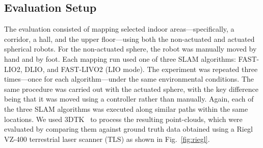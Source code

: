 \documentclass[a4paper, conference]{IEEEtran}
\begin{document}
\subsection{Evaluation Setup}
The evaluation consisted of mapping selected indoor areas—specifically, a corridor, a hall, and the upper floor—using both the non-actuated and actuated spherical robots. 
For the non-actuated sphere, the robot was manually moved by hand and by foot. 
Each mapping run used one of three SLAM algorithms: FAST-LIO2, DLIO, and FAST-LIVO2 (LIO mode). 
The experiment was repeated three times—once for each algorithm—under the same environmental conditions. 
The same procedure was carried out with the actuated sphere, with the key difference being that it was moved using a controller rather than manually. 
Again, each of the three SLAM algorithms was executed along similar paths within the same locations. 
We used 3DTK~\cite{3dtk} to process the resulting point-clouds, which were evaluated by comparing them against ground truth data obtained using a Riegl VZ-400 terrestrial laser scanner (TLS) as shown in Fig.~\ref{fig:riegl}.
\end{document}
